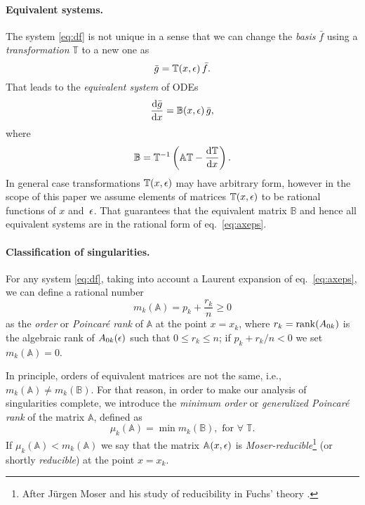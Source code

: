\documentclass[12pt,a4paper]{article}
\def\M#1{\mathbb{#1}} %
\begin{document}
\paragraph{Equivalent systems.}
The system \eqref{eq:df} is not unique in a sense that we can change the {\em basis} $\bar{f}$ using a {\em transformation} $\M T$ to a new one as
\begin{equation}
\label{eq:gtf}
  \bar{g} = \M T(x,\eps)\, \bar{f}.
\end{equation}
That leads to the {\em equivalent system} of ODEs
\begin{equation}
  \frac{\D \bar{g}}{\D x} = \M B(x,\eps)\,\bar{g},
\end{equation}
where
\begin{equation}
\label{eq:bta}
  \M B = \M T^{-1} \left( \M A \M T - \frac{\D \M T}{\D x} \right).
\end{equation}
In general case transformations $\M T(x,\eps)$ may have arbitrary form, however in the scope of this paper we assume elements of matrices $\M T(x,\eps)$ to be rational functions of $x$ and~$\epsilon$.
That guarantees that the equivalent matrix $\M B$ and hence all equivalent systems are in the rational form of eq.~\eqref{eq:axeps}.

\paragraph{Classification of singularities.}
For any system \eqref{eq:df}, taking into account a Laurent expansion of eq.~\eqref{eq:axeps}, we can define a rational number
\begin{equation}
\label{eq:mk}
  m_k(\M A) = p_k + \frac{r_k}{n} \ge 0
\end{equation}
as the {\em order} or {\em Poincar\'e rank} of $\M A$ at the point $x=x_k$, where $r_k = \mathrm{rank}(A_{0k})$ is the algebraic rank of $A_{0k}(\epsilon)$ such that $0 \le r_k \le n$; if $p_k + r_k/n < 0$ we set $m_k(\M A) = 0$.

In principle, orders of equivalent matrices are not the same, i.e., $m_k(\M A) \ne m_k(\M B)$.
For that reason, in order to make our analysis of singularities complete, we introduce the {\em minimum order} or {\em generalized Poincar\'e rank} of the matrix $\M A$, defined as
\begin{equation}
\label{eq:muk}
  \mu_k(\M A) = \min m_k(\M B), \text{ for } \forall \; \M T.
\end{equation}
If $\mu_k(\M A) < m_k(\M A)$ we say that the matrix $\M A(x,\eps)$ is {\em Moser-reducible}\footnote{After J\"urgen Moser and his study of reducibility in Fuchs' theory \cite{Mos59}.} (or shortly {\em reducible}) at the point $x=x_k$.
\end{document}
